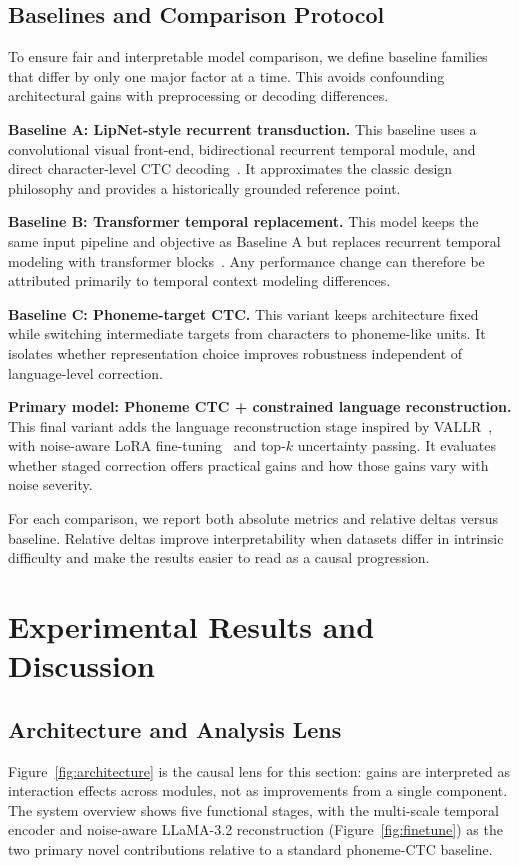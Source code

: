 \documentclass[10pt,twocolumn,letterpaper]{article}
\begin{document}
\subsection{Baselines and Comparison Protocol}
To ensure fair and interpretable model comparison, we define baseline families that differ by only one major factor at a time. This avoids confounding architectural gains with preprocessing or decoding differences.

\textbf{Baseline A: LipNet-style recurrent transduction.}
This baseline uses a convolutional visual front-end, bidirectional recurrent temporal module, and direct character-level CTC decoding~\cite{assael2016lipnet}. It approximates the classic design philosophy and provides a historically grounded reference point.

\textbf{Baseline B: Transformer temporal replacement.}
This model keeps the same input pipeline and objective as Baseline A but replaces recurrent temporal modeling with transformer blocks~\cite{vaswani2017attention}. Any performance change can therefore be attributed primarily to temporal context modeling differences.

\textbf{Baseline C: Phoneme-target CTC.}
This variant keeps architecture fixed while switching intermediate targets from characters to phoneme-like units. It isolates whether representation choice improves robustness independent of language-level correction.

\textbf{Primary model: Phoneme CTC + constrained language reconstruction.}
This final variant adds the language reconstruction stage inspired by VALLR~\cite{thomas2025vallr}, with noise-aware LoRA fine-tuning~\cite{hu2022lora} and top-$k$ uncertainty passing. It evaluates whether staged correction offers practical gains and how those gains vary with noise severity.

For each comparison, we report both absolute metrics and relative deltas versus baseline. Relative deltas improve interpretability when datasets differ in intrinsic difficulty and make the results easier to read as a causal progression.

\section{Experimental Results and Discussion}

\subsection{Architecture and Analysis Lens}
Figure~\ref{fig:architecture} is the causal lens for this section: gains are interpreted as interaction effects across modules, not as improvements from a single component. The system overview shows five functional stages, with the multi-scale temporal encoder and noise-aware LLaMA-3.2 reconstruction (Figure~\ref{fig:finetune}) as the two primary novel contributions relative to a standard phoneme-CTC baseline.
\end{document}
